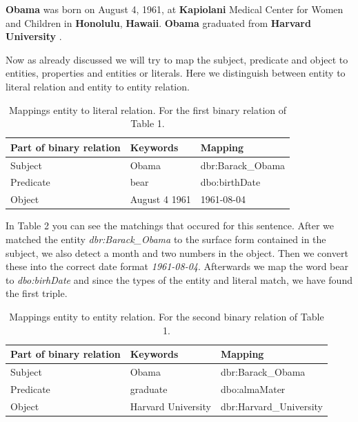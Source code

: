 \documentclass[runningheads]{llncs}
\begin{document}
\begin{example}
\textbf{Obama} was born on August 4, 1961, at \textbf{Kapiolani} Medical Center for
Women and Children in \textbf{Honolulu}, \textbf{Hawaii}. \textbf{Obama} graduated from
\textbf{Harvard University} .\end{example}

Now as already discussed we will try to map the subject, predicate and object to entities, properties and entities or literals. Here we distinguish between entity to literal relation and entity to entity relation.

\begin{table}
	\caption{Mappings entity to literal relation. For the first binary relation of Table 1.}\label{tab2}
	\begin{center}
		\begin{tabularx}{\textwidth}{@{}|l|l|Y|@{}}
			\hline
			\textbf{Part of binary relation} &  \textbf{Keywords} & \textbf{Mapping}\\
			\hline
			Subject &  Obama & dbr:Barack\_Obama\\
			Predicate &  bear & dbo:birthDate\\
			Object &  August 4 1961  & 1961-08-04\\
			\hline
		\end{tabularx}
	\end{center}
\end{table}
In Table 2 you can see the matchings that occured for this sentence. After we matched the entity 
\textit{dbr:Barack\_Obama} to the surface form contained in the subject, we also detect a month and two numbers in the object. Then we convert these into the correct date format \textit{1961-08-04}. Afterwards we map the 
word bear to \textit{dbo:birhDate} and since the types of the entity and literal match, we have found the first triple.

\begin{table}
	\caption{Mappings entity to entity relation. For the second binary relation of Table 1.}\label{tab3}
	\begin{center}
		\begin{tabularx}{\textwidth}{@{}|l|l|Y|@{}}
			\hline
			\textbf{Part of binary relation} &  \textbf{Keywords} & \textbf{Mapping}\\
			\hline
			Subject &  Obama & dbr:Barack\_Obama\\
			Predicate &  graduate & dbo:almaMater\\
			Object &  Harvard University  & dbr:Harvard\_University\\
			\hline
		\end{tabularx}
	\end{center}
\end{table}
\end{document}
